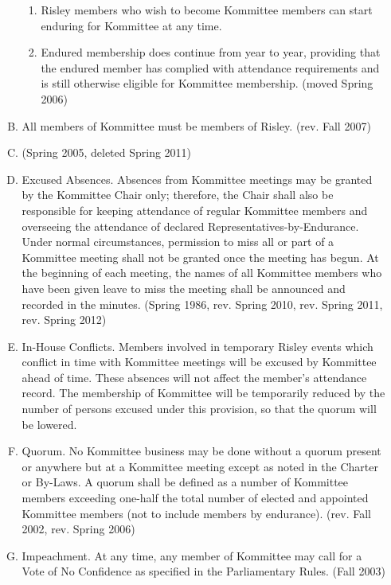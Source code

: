 \documentclass[12pt]{article}
\begin{document}
\begin{enumerate}[A.]
\begin{enumerate}[A.]
\begin{enumerate}[1.]
\item Risley members who wish to become Kommittee members can start enduring for Kommittee at any time.
\item Endured membership does continue from year to year, providing that the endured member has complied with attendance requirements and is still otherwise eligible for Kommittee membership. (moved Spring 2006)
\end{enumerate}
\item All members of Kommittee must be members of Risley. (rev. Fall 2007)

\item (Spring 2005, deleted Spring 2011)

\item Excused Absences. Absences from Kommittee meetings may be granted by the Kommittee Chair only; therefore, the Chair shall also be responsible for keeping attendance of regular Kommittee members and overseeing the attendance of declared Representatives-by-Endurance. Under normal circumstances, permission to miss all or part of a Kommittee meeting shall not be granted once the meeting has begun. At the beginning of each meeting, the names of all Kommittee members who have been given leave to miss the meeting shall be announced and recorded in the minutes. (Spring 1986, rev. Spring 2010, rev. Spring 2011, rev. Spring 2012)

\item In-House Conflicts. Members involved in temporary Risley events which conflict in time with Kommittee meetings will be excused by Kommittee ahead of time. These absences will not affect the member's attendance record. The membership of Kommittee will be temporarily reduced by the number of persons excused under this provision, so that the quorum will be lowered.

\item Quorum. No Kommittee business may be done without a quorum present or anywhere but at a Kommittee meeting except as noted in the Charter or By-Laws. A quorum shall be defined as a number of Kommittee members exceeding one-half the total number of elected and appointed Kommittee members (not to include members by endurance). (rev. Fall 2002, rev. Spring 2006)

\item Impeachment. At any time, any member of Kommittee may call for a Vote of No Confidence as specified in the Parliamentary Rules. (Fall 2003)
\end{enumerate}
\end{enumerate}
\end{document}
